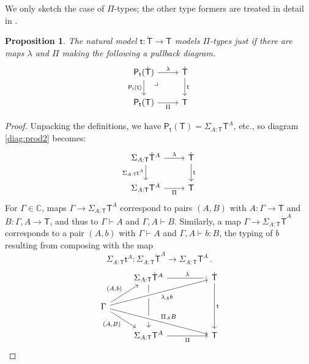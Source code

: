 \documentclass[12pt,reqno]{amsart}
\newcommand{\C}{\ensuremath{\mathbb{C}}}
\newcommand{\alg}[1]{\ensuremath{\mathsf{#1}}}
\renewcommand{\to}{\ensuremath{\rightarrow}}
\newcommand{\G}{\ensuremath{\Gamma}}
\newcommand{\ext}[2]{{#1,#2}}
\renewcommand{\t}{\ensuremath{\mathsf{t}}}
\newcommand{\tT}{\ensuremath{{\t}:\TT\to\T}}
\newcommand{\T}{\ensuremath{\mathsf{T}}}
\newcommand{\TT}{\ensuremath{\dot{\mathsf{T}}}}
\newcommand{\pbcorner}{\arrow[dr,phantom,"\lrcorner" very near start, shift right=.5ex]} %
\newtheorem{proposition}[theorem]{Proposition}
\theoremstyle{remark}
\theoremstyle{definition}
\begin{document}
We only sketch the case of $\Pi$-types; the other type formers are treated in detail in \cite{awodey:NM, Newstead:thesis, NA:2018}.

\begin{proposition}  The natural model $\tT$ models $\Pi$-types just if there are maps $\lambda$ and $\Pi$ making the following a pullback diagram. 
\begin{equation}\label{diag:prod2}
\begin{tikzcd}
\alg{P}_\t(\TT)  \ar[d,swap, "{\alg{P}_\t(\t)}"]   \ar[r, "\lambda"]  \pbcorner &  \TT \ar[d, "{\t}"]\\
\alg{P}_\t(\T)	\ar[r,swap, "{\Pi}"] & \T
\end{tikzcd}
\end{equation}
\end{proposition}
%
\begin{proof}
Unpacking the definitions, we have $\alg{P}_\t(\T) = \Sigma_{A:\T} \T^A $, etc.,  
so diagram \eqref{diag:prod2} becomes:
\begin{equation*}%
\begin{tikzcd}
\Sigma_{A:\T} \TT^A \ar[d,swap, "{\Sigma_{A:\T} \t^A}"]  \ar[r, "{\lambda}"] &  \TT \ar[d,"{\t}"] \\
\Sigma_{A:\T} \T^A    \ar[r, swap,"{\Pi}"] & \T
\end{tikzcd}
\end{equation*}
For $\G \in \C$, maps $\G\to \Sigma_{A:\T} \T^A $ correspond to pairs $(A,B)$ with  $A:\G\to \T$ and $B : \ext{\G}{A} \to \T$, and thus to $\G\vdash A$ and $\ext{\G}{A} \vdash B$. Similarly, a map $\G\to \Sigma_{A:\T} \TT^A $ corresponds to a pair $(A,b)$ with $\G\vdash A$ and $\ext{\G}{A} \vdash b : B$, the typing of $b$ resulting from composing with the map 
\[
\Sigma_{A:\T} \t^A : \Sigma_{A:\T} \TT^A \to \Sigma_{A:\T} \T^A\,.
\]
\begin{equation*}%
\begin{tikzcd}
	& \Sigma_{A:\T} \TT^A \ar[dd]  \ar[rr, "{\lambda}"] &&  \TT \ar[dd,"{\t}"] \\
\G \ar[dr,swap, "{(A,B)}"] \ar[ru, "{(A,b)}"] \ar[urrr, swap, crossing over, "{ \lambda_{A}b }"] \ar[drrr, crossing over, "{ \Pi_{A}B }"] &&& \\
 	& \Sigma_{A:\T}\T^A    \ar[rr, swap,"{\Pi}"] && \T 

\end{tikzcd}
\end{equation*}
\end{proof}
\end{document}
